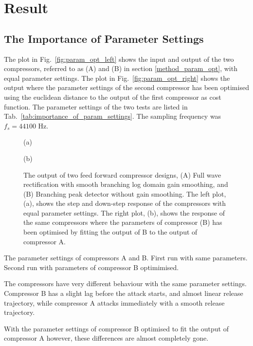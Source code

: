\documentclass[../main2.tex]{subfiles}
\providecommand{\rootdir}{..}
\begin{document}
\section{Result}\label{results}

\subsection{The Importance of Parameter Settings}
The plot in Fig.~\ref{fig:param_opt_left} shows the input and output of the two compressors, referred to as (A) and (B) in section \ref{method_param_opt}, with equal parameter settings. The plot in Fig.~\ref{fig:param_opt_right} shows the output where the parameter settings of the second compressor has been optimised using the euclidean distance to the output of the first compressor as cost function. The parameter settings of the two tests are listed in Tab.~\ref{tab:importance_of_param_settings}. The sampling frequency was $f_s = 44100$ Hz.

\begin{figure}[ht]
\captionsetup*{justification=centering}
\begin{minipage}[t]{.5\textwidth}
 \centering

\caption*{(a)} 
\label{fig:param_opt_left}
\end{minipage}%
\begin{minipage}[t]{.5\textwidth}
\centering

\caption*{(b)} 
\label{fig:param_opt_right}
\end{minipage}
\caption{The output of two feed forward compressor designs, (A) Full wave rectification with smooth branching log domain gain smoothing, and (B) Branching peak detector without gain smoothing. The left plot, (a), shows the step and down-step response of the compressors with equal parameter settings. The right plot, (b), shows the response of the same compressors where the parameters of compressor (B) has been optimised by fitting the output of B to the output of compressor A.}
\label{fig:param_opt}
\end{figure}

\begin{table}[h]
\small
\begin{center}
\caption{The parameter settings of compressors A and B. First run with same parameters. Second run with parameters of compressor B optimimised.}
\label{tab:importance_of_param_settings}

\end{center}
\end{table}

The compressors have very different behaviour with the same parameter settings. Compressor B has a slight lag before the attack starts, and almost linear release trajectory, while compressor A attacks immediately with a smooth release trajectory.

With the parameter settings of compressor B optimised to fit the output of compressor A however, these differences are almost completely gone. 

\FloatBarrier

\FloatBarrier
\end{document}
